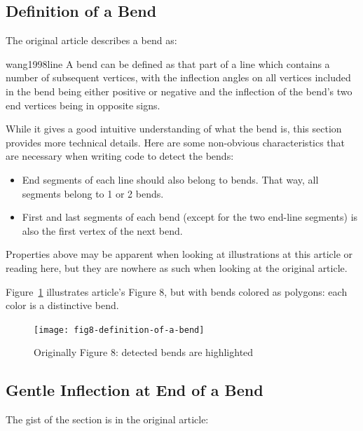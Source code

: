 \documentclass[a4paper]{article}
\begin{document}
\subsection{Definition of a Bend}
\label{sec:definition-of-a-bend}

The original article describes a bend as:

\begin{displaycquote}{wang1998line}
    A bend can be defined as that part of a line which contains a number of
    subsequent vertices, with the inflection angles on all vertices included in
    the bend being either positive or negative and the inflection of the bend's
    two end vertices being in opposite signs.
\end{displaycquote}

While it gives a good intuitive understanding of what the bend is, this section
provides more technical details. Here are some non-obvious characteristics that
are necessary when writing code to detect the bends:

\begin{itemize}
    \item End segments of each line should also belong to bends. That way, all
        segments belong to 1 or 2 bends.

    \item First and last segments of each bend (except for the two end-line
        segments) is also the first vertex of the next bend.
\end{itemize}

Properties above may be apparent when looking at illustrations at this article
or reading here, but they are nowhere as such when looking at the original
article.

Figure~\ref{fig:fig8-definition-of-a-bend} illustrates article's Figure 8,
but with bends colored as polygons: each color is a distinctive bend.

\begin{figure}[h]
    \centering
    \texttt{[image: fig8-definition-of-a-bend]}
    \caption{Originally Figure 8: detected bends are highlighted}
    \label{fig:fig8-definition-of-a-bend}
\end{figure}

\subsection{Gentle Inflection at End of a Bend}

The gist of the section is in the original article:
\end{document}
